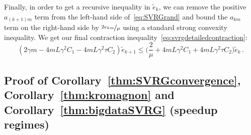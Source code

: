 \documentclass[twoside, 11pt]{article}
\newcommand{\stepsize}{\gamma}
\newcommand{\strongconvex}{\mu}
\newcommand{\overlap}{\tau}
\newcommand{\lipschitz}{L}
\begin{document}
Finally, in order to get a recursive inequality in $\tilde e_k$, we can remove the positive $a_{(k+1)m}$ term from the left-hand side of~\eqref{eq:SVRGrand} and bound the $a_{km}$ term on the right-hand side by $\nicefrac{2e_{km}}{\strongconvex}$ using a standard strong convexity inequality.
We get our final contraction inequality~\eqref{eq:svrgdetailedcontraction}:
\begin{equation*}
(2\stepsize m - 4m\lipschitz \stepsize^2 C_1 - 4m\lipschitz \stepsize^2 \overlap C_2) \tilde e_{k+1}
\leq
\big(\frac{2}{\strongconvex} + 4m\lipschitz \stepsize^2 C_1 + 4 m \lipschitz \stepsize^2\overlap C_2\big) \tilde e_k \,.
\end{equation*}
\hfill\BlackBox

\subsection{Proof of Corollary~\ref{thm:SVRGconvergence}, Corollary~\ref{thm:kromagnon} and Corollary~\ref{thm:bigdataSVRG} (speedup regimes)}
\end{document}
